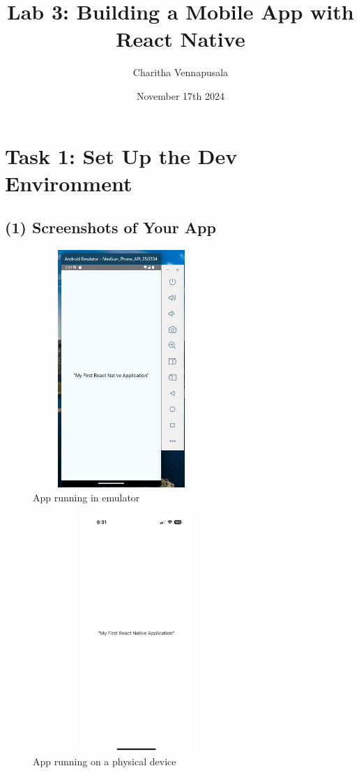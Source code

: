 \documentclass[12pt]{article}
\title{Lab 3: Building a Mobile App with React Native}
\author{Charitha Vennapusala}
\date{November 17th 2024}
\begin{document}
\maketitle
\section*{Task 1: Set Up the Dev Environment}
\subsection*{(1) Screenshots of Your App}
\begin{figure}[H] 
    \centering
    \includegraphics[width=0.6\textwidth, height=9cm]{images/emulator_screenshot.png.png}
    \caption{App running in emulator}
    \label{fig:emulator} 
\end{figure}
\begin{figure}[H] 
    \centering
    \includegraphics[width=0.7\textwidth, height=9cm]{images/physical_device_screenshot.png.png}
    \caption{App running on a physical device}
    \label{fig:physical_device} 
\end{figure}
\end{document}
